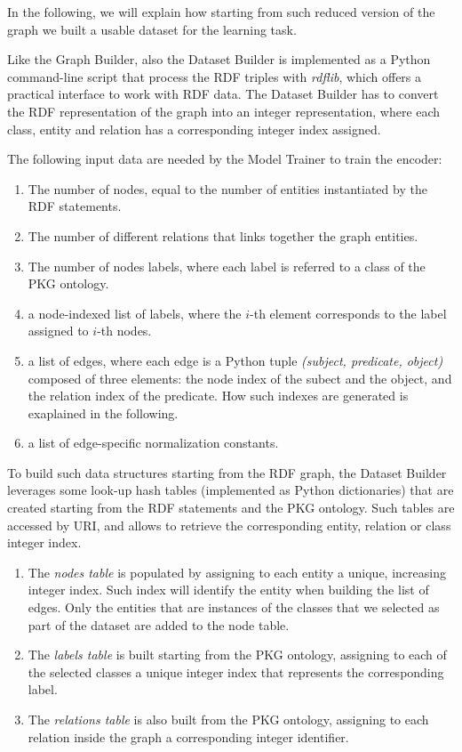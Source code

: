\documentclass[%
    corpo=13.5pt,
    twoside,
    oldstyle,
    tipotesi=magistrale,
    greek,
    evenboxes
]{toptesi}
\begin{document}
In the following, we will explain how starting from such reduced version of the
graph we built a usable dataset for the learning task.
\newline

Like the Graph Builder, also the Dataset Builder is implemented as a
Python command-line script that process the RDF triples with \emph{rdflib},
which offers a practical interface to work with RDF data.
The Dataset Builder has to convert the RDF representation of the graph into
an integer representation, where each class, entity and relation has a
corresponding integer index assigned.

The following input data are needed by the Model Trainer to train the
encoder:

\begin{enumerate}
    \item The number of nodes, equal to the number of entities instantiated by
        the RDF statements.
    \item The number of different relations that links together the graph
        entities.
    \item The number of nodes labels, where each label is referred to a class of
        the PKG ontology.
    \item a node-indexed list of labels, where the $i$-th element corresponds to
        the label assigned to $i$-th nodes.
    \item a list of edges, where each edge is
        a Python tuple \emph{(subject, predicate, object)} composed of three
        elements: the node index of the subect and the object, and the
        relation index of the predicate. How such indexes are generated is
        exaplained in the following.
    \item a list of edge-specific normalization constants.
\end{enumerate}

To build such data structures starting from the RDF graph, the Dataset Builder
leverages some look-up hash tables (implemented as Python dictionaries) that are
created starting from the RDF statements and the PKG ontology. Such tables
are accessed by URI, and allows to retrieve the corresponding entity, relation
or class integer index.

\begin{enumerate}
    \item The \emph{nodes table} is populated by assigning to each entity
    a unique, increasing integer index. Such index will identify the entity when
    building the list of edges. Only the entities that are instances of the
    classes that we selected as part of the dataset are added to the node table.

    \item The \emph{labels table} is built starting from the PKG ontology,
    assigning to each of the selected classes a unique integer index that
    represents the corresponding label.

    \item The \emph{relations table} is also built from the PKG ontology,
    assigning to each relation inside the graph a corresponding integer
    identifier.
\end{enumerate}
\end{document}
